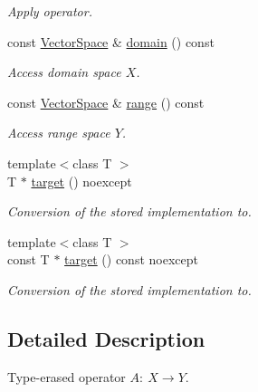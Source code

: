 \begin{DoxyCompactItemize}
\begin{DoxyCompactList}\small\item\em \-Apply operator. \end{DoxyCompactList}\item 
\hypertarget{classSpacy_1_1Operator_a3b3d457bee48adf00d683a6aec4aa841}{const \hyperlink{classSpacy_1_1VectorSpace}{\-Vector\-Space} \& \hyperlink{classSpacy_1_1Operator_a3b3d457bee48adf00d683a6aec4aa841}{domain} () const }\label{classSpacy_1_1Operator_a3b3d457bee48adf00d683a6aec4aa841}

\begin{DoxyCompactList}\small\item\em \-Access domain space $X$. \end{DoxyCompactList}\item 
\hypertarget{classSpacy_1_1Operator_a8cf3b1e3b6c5c6ab5ddc09224ed8ab24}{const \hyperlink{classSpacy_1_1VectorSpace}{\-Vector\-Space} \& \hyperlink{classSpacy_1_1Operator_a8cf3b1e3b6c5c6ab5ddc09224ed8ab24}{range} () const }\label{classSpacy_1_1Operator_a8cf3b1e3b6c5c6ab5ddc09224ed8ab24}

\begin{DoxyCompactList}\small\item\em \-Access range space $Y$. \end{DoxyCompactList}\item 
{\footnotesize template$<$class T $>$ }\\\-T $\ast$ \hyperlink{classSpacy_1_1Operator_afabc47b5debc681bb985865adc0e9fa1}{target} () noexcept
\begin{DoxyCompactList}\small\item\em \-Conversion of the stored implementation to. \end{DoxyCompactList}\item 
{\footnotesize template$<$class T $>$ }\\const \-T $\ast$ \hyperlink{classSpacy_1_1Operator_af4f5fc9968599011c56a59665fe42e0a}{target} () const noexcept
\begin{DoxyCompactList}\small\item\em \-Conversion of the stored implementation to. \end{DoxyCompactList}\end{DoxyCompactItemize}


\subsection{\-Detailed \-Description}
\-Type-\/erased operator $A:\ X \to Y $. 

